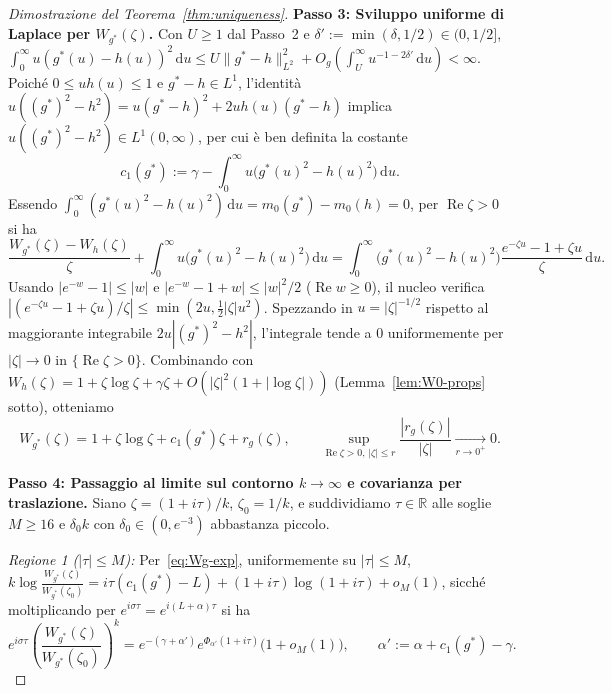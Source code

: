 \documentclass[11pt, reqno]{amsart}
\theoremstyle{remark}
\numberwithin{equation}{section}
\DeclareMathOperator{\re}{Re}
\newcommand{\R}{\mathbb{R}}
\newcommand{\dd}{\,\mathrm{d}}
\begin{document}
\begin{proof}[Dimostrazione del Teorema~\ref{thm:uniqueness}]
\smallskip
\noindent\textbf{Passo 3: Sviluppo uniforme di Laplace per $W_{g^*}(\zeta)$.}
Con $U \ge 1$ dal Passo~2 e $\delta' := \min(\delta, 1/2) \in (0, 1/2]$,
$\int_0^\infty u(g^*(u)-h(u))^2\dd u \le U\|g^*-h\|_{L^2}^2 + O_g(\int_U^\infty u^{-1-2\delta'}\dd u) < \infty$.
Poiché $0 \le u h(u) \le 1$ e $g^*-h \in L^1$, l'identità
$u((g^*)^2 - h^2) = u(g^*-h)^2 + 2u h(u)(g^*-h)$ implica $u((g^*)^2-h^2) \in L^1(0,\infty)$, per cui è
ben definita la costante
\[
c_1(g^*) := \gamma - \int_0^\infty u\bigl(g^*(u)^2 - h(u)^2\bigr)\dd u.
\]
Essendo $\int_0^\infty (g^*(u)^2 - h(u)^2)\dd u = m_0(g^*) - m_0(h) = 0$, per $\re\zeta > 0$ si ha
\[
\frac{W_{g^*}(\zeta) - W_h(\zeta)}{\zeta} + \int_0^\infty u\bigl(g^*(u)^2 - h(u)^2\bigr)\dd u
= \int_0^\infty \bigl(g^*(u)^2 - h(u)^2\bigr)\frac{e^{-\zeta u} - 1 + \zeta u}{\zeta}\dd u.
\]
Usando $|e^{-w}-1| \le |w|$ e $|e^{-w}-1+w| \le |w|^2/2$ ($\re w \ge 0$), il nucleo verifica
$|(e^{-\zeta u}-1+\zeta u)/\zeta| \le \min(2u, \frac{1}{2}|\zeta| u^2)$. Spezzando in $u = |\zeta|^{-1/2}$
rispetto al maggiorante integrabile $2u|(g^*)^2-h^2|$, l'integrale tende a $0$ uniformemente per $|\zeta| \to 0$
in $\{\re\zeta > 0\}$. Combinando con $W_h(\zeta) = 1 + \zeta\log\zeta + \gamma\zeta + O(|\zeta|^2(1+|\log\zeta|))$
(Lemma~\ref{lem:W0-props} sotto), otteniamo
\begin{equation}\label{eq:Wg-exp}
W_{g^*}(\zeta) = 1 + \zeta\log\zeta + c_1(g^*)\zeta + r_g(\zeta),
\qquad \sup_{\re\zeta > 0,\, |\zeta| \le r} \frac{|r_g(\zeta)|}{|\zeta|} \xrightarrow[r\to 0^+]{} 0.
\end{equation}

\smallskip
\noindent\textbf{Passo 4: Passaggio al limite sul contorno $k \to \infty$ e covarianza per traslazione.}
Siano $\zeta = (1+i\tau)/k$, $\zeta_0 = 1/k$, e suddividiamo $\tau \in \R$ alle soglie $M \ge 16$ e $\delta_0 k$
con $\delta_0 \in (0, e^{-3})$ abbastanza piccolo.

\emph{Regione 1 ($|\tau| \le M$):} Per~\eqref{eq:Wg-exp}, uniformemente su $|\tau| \le M$,
$k\log\frac{W_{g^*}(\zeta)}{W_{g^*}(\zeta_0)} = i\tau(c_1(g^*)-L) + (1+i\tau)\log(1+i\tau) + o_M(1)$,
sicché moltiplicando per $e^{i\sigma\tau} = e^{i(L+\alpha)\tau}$ si ha
\[
e^{i\sigma\tau}\left(\frac{W_{g^*}(\zeta)}{W_{g^*}(\zeta_0)}\right)^{\!k}
= e^{-(\gamma+\alpha')} e^{\Phi_{\alpha'}(1+i\tau)}\bigl(1 + o_M(1)\bigr),
\qquad \alpha' := \alpha + c_1(g^*) - \gamma.
\]


\end{proof}
\end{document}
